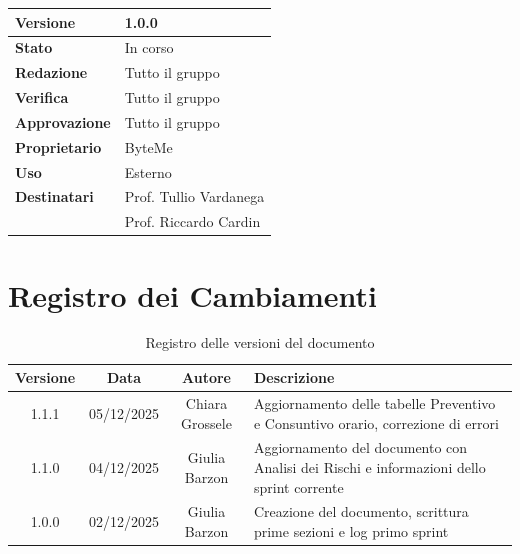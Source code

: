 \documentclass[11pt,a4paper]{article}
\begin{document}
\begin{titlepage}
    \begin{table}[H]
        \centering
        \begin{tabular}{|l|p{5cm}|}
            \hline
            \textbf{Versione} & 1.0.0 \\
            \hline
            \textbf{Stato} & In corso \\
            \hline
            \textbf{Redazione} & Tutto il gruppo \\
            \hline
            \textbf{Verifica} & Tutto il gruppo \\
            \hline
            \textbf{Approvazione} & Tutto il gruppo \\
            \hline
            \textbf{Proprietario} & ByteMe \\
            \hline
            \textbf{Uso} & Esterno \\
            \hline
            \textbf{Destinatari} & Prof. Tullio Vardanega \\ & Prof. Riccardo Cardin \\
            \hline
        \end{tabular}
    \end{table}
    
    \vfill
\end{titlepage}

\thispagestyle{empty}
\section*{Registro dei Cambiamenti}

\begin{table}[H]
    \centering
    \begin{tabular}{|c|c|c|>{\raggedright\arraybackslash}p{}|}
        \hline
        \textbf{Versione} & \textbf{Data} & \textbf{Autore} & \textbf{Descrizione} \\
        \hline
        1.1.1 & 05/12/2025 & Chiara Grossele & Aggiornamento delle tabelle Preventivo e Consuntivo orario, correzione di errori\\
        \hline
        1.1.0 & 04/12/2025 & Giulia Barzon & Aggiornamento del documento con Analisi dei Rischi e informazioni dello sprint corrente\\
        \hline
        1.0.0 & 02/12/2025 & Giulia Barzon & Creazione del documento, scrittura prime sezioni e log primo sprint \\
        \hline
    \end{tabular}
    \caption{Registro delle versioni del documento}
    \label{tab:versionamento}
\end{table}
\end{document}

